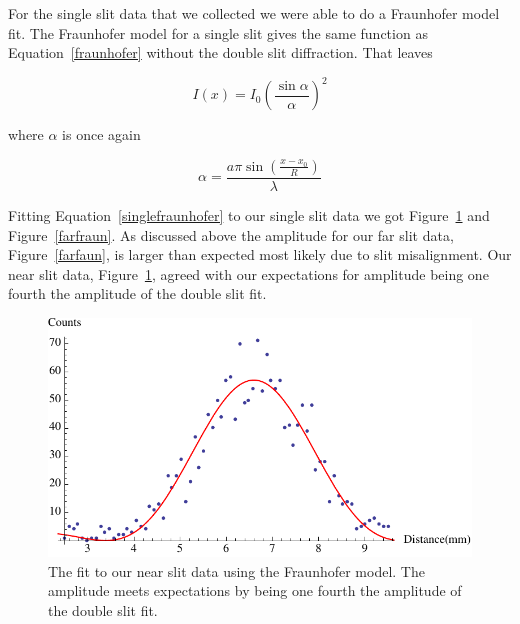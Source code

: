 \documentclass[prb,preprint]{revtex4-1}
\begin{document}
For the single slit data that we collected we were able to do a Fraunhofer model fit. The Fraunhofer model for a single slit gives the same function as Equation~\ref{fraunhofer} without the double slit diffraction. That leaves

\begin{equation}
\label{singlefraunhofer}
I(x) = I_0 \left(\frac{\sin\alpha}{\alpha}\right)^2
\end{equation}
 
 where $\alpha$ is once again

\begin{equation}
\label{alpha}
\alpha = \frac{a \pi \sin(\frac{x - x_0}{R})}{\lambda}
\end{equation}

Fitting Equation~\ref{singlefraunhofer} to our single slit data we got Figure~\ref{nearfraun} and Figure~\ref{farfraun}. As discussed above the amplitude for our far slit data, Figure~\ref{farfaun}, is larger than expected most likely due to slit misalignment. Our near slit data, Figure~\ref{nearfraun}, agreed with our expectations for amplitude being one fourth the amplitude of the double slit fit.

\begin{figure}[h!]
\centering
\includegraphics[width=6in]{nearfraun.pdf}
\caption{The fit to our near slit data using the Fraunhofer model. The amplitude meets expectations by being one fourth the amplitude of the double slit fit.}
\label{nearfraun}
\end{figure}
\end{document}
